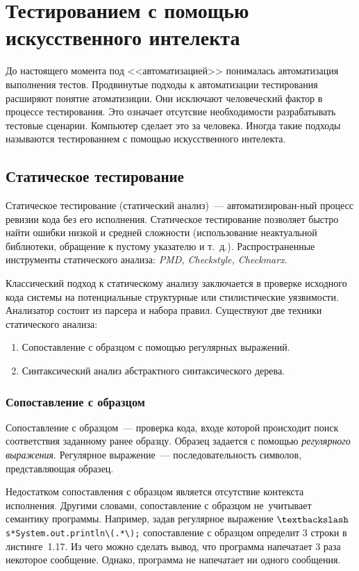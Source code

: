 \section{Тестированием с помощью искусственного интелекта} 

До настоящего момента под <<автоматизацией>> понималась автоматизация выполнения тестов. Продвинутые подходы к автоматизации тестирования расширяют понятие атоматизиции. Они исключают человеческий фактор в процессе тестирования. Это означает отсутсвие необходимости разрабатывать тестовые сценарии. Компьютер сделает это за человека. Иногда такие подходы называются тестированием с помощью искусственного интелекта.

\subsection{Статическое тестирование} 

Статическое тестирование (статический анализ)~--- автоматизирован-ный процесс ревизии кода без его исполнения. Статическое тестирование позволяет быстро найти ошибки низкой и средней сложности (использование неактуальной библиотеки, обращение к пустому указателю и т.~д.). Распространенные инструменты статического анализа: \textit{PMD, Checkstyle, Checkmarx}.

Классический подход к статическому анализу заключается в проверке исходного кода системы на потенциальные структурные или стилистические уязвимости. Анализатор состоит из парсера и набора правил. Существуют две техники статического анализа:


\begin{enumerate}
	\item Сопоставление с образцом с помощью регулярных выражений.
	\item Синтаксический анализ абстрактного синтаксического дерева.
\end{enumerate}


\subsubsection{Сопоставление с образцом}

Сопоставление с образцом~--- проверка кода, входе которой происходит поиск соответствия заданному ранее образцу. Образец задается с помощью \textit{регулярного выражения}. Регулярное выражение~--- последовательность символов, представляющая образец.

Недостатком сопоставления с образцом является отсутствие контекста исполнения. Другими словами, сопоставление с образцом не~учитывает семантику программы. Например, задав регулярное выражение \texttt{$\textbackslash$s*System.out.println\textbackslash(.*\textbackslash);} сопоставление с образцом определит 3 строки в листинге~1.17. Из чего можно сделать вывод, что программа напечатает 3 раза некоторое сообщение. Однако, программа не напечатает ни одного сообщения. 

